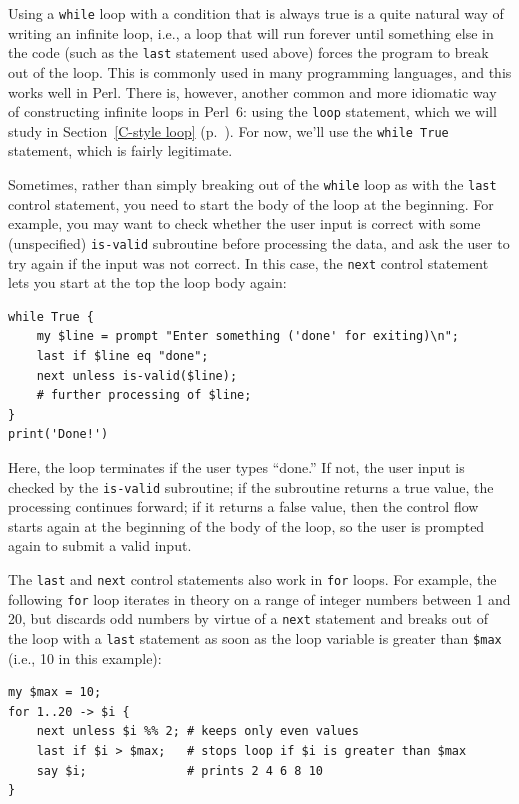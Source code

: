 Using a {\tt while} loop with a condition that is always true 
is a quite natural way of writing an infinite loop, i.e., a 
loop that will run forever until something else in the code 
(such as the {\tt last} statement used above) forces the 
program to break out of the loop. This is commonly used in 
many programming languages, and this works well in Perl. There 
is, however, another common and more idiomatic way of constructing 
infinite loops in Perl~6: using the {\tt loop} statement, 
which we will study in Section~\ref{C-style loop} 
(p.~\pageref{C-style loop}). For now, we'll use the {\tt while True} 
statement, which is fairly legitimate.

Sometimes, rather than simply breaking out of the {\tt while}  loop 
as with the {\tt last} control statement, you need to start the 
body of the loop at the beginning. For example, you may want 
to check whether the user input is correct with some 
(unspecified) {\tt is-valid} subroutine before processing 
the data, and ask the user to try again if the input was not 
correct. In this case, the {\tt next} control statement lets 
you start at the top the loop body again:

\begin{verbatim}
while True {
    my $line = prompt "Enter something ('done' for exiting)\n";
    last if $line eq "done";
    next unless is-valid($line);
    # further processing of $line;
}
print('Done!')
\end{verbatim}
%
Here, the loop terminates if the user types ``done.'' If not, the user input is checked by the {\tt is-valid} subroutine; if the subroutine returns a true value, the processing continues forward; if it returns a false value, then the control flow starts again at the beginning of the body of the loop, so the user is prompted again to submit a valid input.

The {\tt last} and {\tt next} control statements also work in 
{\tt for} loops. For example, the following {\tt for} loop 
iterates in theory on a range of integer numbers between 1 and 20, 
but discards odd numbers by virtue of a {\tt next} statement 
and breaks out of the loop with a {\tt last} statement as 
soon as the loop variable is greater than {\tt \$max} (i.e., 10 in this  example):

\begin{verbatim}
my $max = 10;
for 1..20 -> $i {
    next unless $i %% 2; # keeps only even values
    last if $i > $max;   # stops loop if $i is greater than $max
    say $i;              # prints 2 4 6 8 10
}
\end{verbatim}

